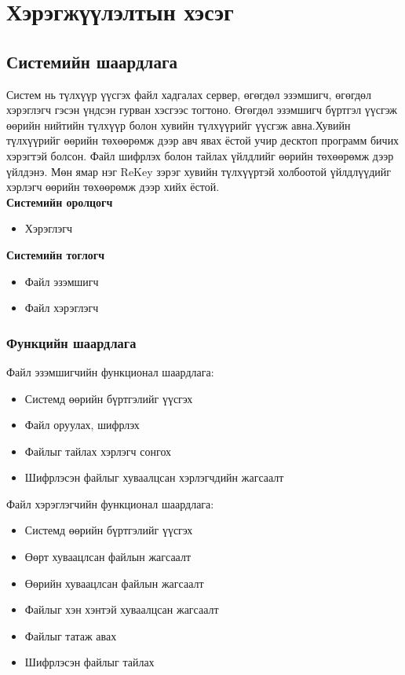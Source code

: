\chapter{Хэрэгжүүлэлтын хэсэг}

\label{Chapter3}
\pagecolor{white}

\section{Системийн шаардлага}
Систем нь түлхүүр үүсгэх файл хадгалах сервер, өгөгдөл эзэмшигч, өгөгдөл хэрэглэгч гэсэн үндсэн гурван хэсгээс тогтоно. Өгөгдөл эзэмшигч бүртгэл үүсгэж өөрийн нийтийн түлхүүр болон хувийн түлхүүрийг үүсгэж авна.Хувийн түлхүүрийг өөрийн төхөөрөмж дээр авч явах ёстой учир десктоп программ бичих хэрэгтэй болсон. Файл шифрлэх болон тайлах үйлдлийг өөрийн төхөөрөмж дээр үйлдэнэ. Мөн ямар нэг ReKey зэрэг хувийн түлхүүртэй холбоотой үйлдлүүдийг хэрлэгч өөрийн төхөөрөмж дээр хийх ёстой. \\

\textbf{Системийн оролцогч}
\begin{itemize}
    \item Хэрэглэгч
\end{itemize}

\textbf{Системийн тоглогч}
\begin{itemize}
    \item Файл эзэмшигч
    \item Файл хэрэглэгч
\end{itemize}

\subsection*{Функцийн шаардлага}
Файл эзэмшигчийн функционал шаардлага:
\begin{itemize}
    \item Системд өөрийн бүртгэлийг үүсгэх
    \item Файл оруулах, шифрлэх
    \item Файлыг тайлах хэрлэгч сонгох
    \item Шифрлэсэн файлыг хуваалцсан хэрлэгчдийн жагсаалт
\end{itemize}
Файл хэрэглэгчийн функционал шаардлага:
\begin{itemize}
    \item Системд өөрийн бүртгэлийг үүсгэх
    \item Өөрт хуваацлсан файлын жагсаалт
    \item Өөрийн хуваацлсан файлын жагсаалт
    \item Файлыг хэн хэнтэй хуваалцсан жагсаалт
    \item Файлыг татаж авах
    \item Шифрлэсэн файлыг тайлах
\end{itemize}

